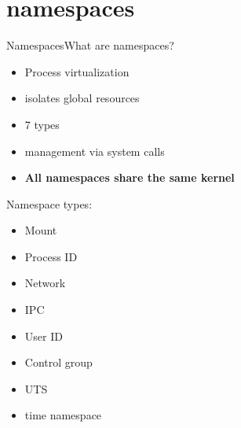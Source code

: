 \section{namespaces}
\large
\begin{frame}{Namespaces}{What are namespaces?}
\begin{minipage}{0.5\textwidth}
    

\begin{itemize}
    \setlength\itemsep{1em}
    \item Process virtualization
    \item isolates global resources
    \item 7 types 
    \item management via system calls
    \item \textbf{All namespaces share the same kernel}
\end{itemize}
\end{minipage}
\hfill
\begin{minipage}{0.3\textwidth}
    \begin{greenblock}{Namespace types:}
        \begin{itemize}
            \item Mount
            \item Process ID
            \item Network
            \item IPC
            \item User ID
            \item Control group
        \item UTS
            \item time namespace
    \end{itemize}
    \end{greenblock}
\end{minipage}
\end{frame}